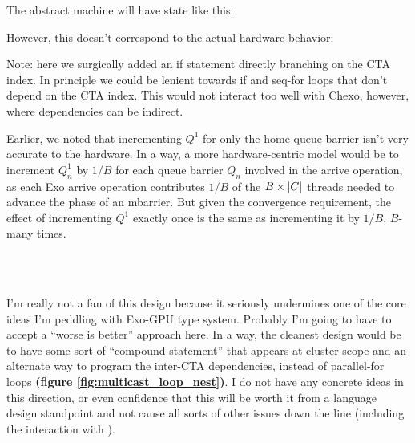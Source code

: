 \filbreak
The abstract machine will have state like this:



\filbreak
However, this doesn't correspond to the actual hardware behavior:



\filbreak
Note: here we surgically added an if statement directly branching on the CTA index.
In principle we could be lenient towards if and seq-for loops that don't depend on the CTA index.
This would not interact too well with Chexo, however, where dependencies can be indirect.

\filbreak
Earlier, we noted that incrementing $Q^1$ for only the home queue barrier isn't very accurate to the hardware.
In a way, a more hardware-centric model would be to increment $Q_n^1$ by $1/B$ for each queue barrier $Q_n$ involved in the arrive operation, as each Exo arrive operation contributes $1/B$ of the $B\times\left \vert C \right\vert$ threads needed to advance the phase of an mbarrier.
But given the convergence requirement, the effect of incrementing $Q^1$ exactly once is the same as incrementing it by $1/B$, $B$-many times.

\begin{figure*}[!b]

\\
\\

\caption{Could we replace the bracketed sections with compound statements that don't involve parallel for loops?} \label{fig:multicast_loop_nest}
\end{figure*}

\filbreak
{}

I'm really not a fan of this design because it seriously undermines one of the core ideas I'm peddling with Exo-GPU type system.
Probably I'm going to have to accept a ``worse is better'' approach here.
In a way, the cleanest design would be to have some sort of ``compound statement'' that appears at cluster scope and an alternate way to program the inter-CTA dependencies, instead of parallel-for loops \textbf{(figure \ref{fig:multicast_loop_nest})}.
I do not have any concrete ideas in this direction, or even confidence that this will be worth it from a language design standpoint and not cause all sorts of other issues down the line (including the interaction with ).

\newpage
{}
\label{ch:tma}

